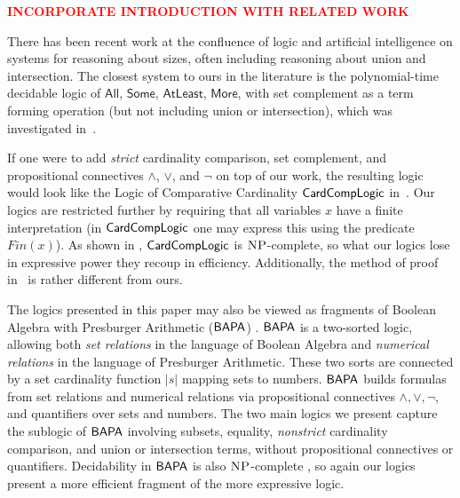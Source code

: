 \documentclass[letterpaper]{article}
\theoremstyle{definition}
\newcommand{\orr}{\vee}
\newcommand{\andd}{\wedge}
\newcommand{\nott}{\neg}
\newcommand{\BAPA}{\sf{BAPA}}
\newcommand{\CardCompLogic}{\sf{CardCompLogic}}
\newcommand{\NP}{\textsc{NP}}
\newcommand{\AllNoArgs}{\mathsf{All}}
\newcommand{\SomeNoArgs}{\mathsf{Some}}
\newcommand{\AtleastNoArgs}{\mathsf{AtLeast}}
\newcommand{\MoreNoArgs}{\mathsf{More}}
\begin{document}
\textbf{\textcolor{red}{INCORPORATE INTRODUCTION WITH RELATED WORK}}

There has been recent work at the confluence of logic and artificial intelligence on systems for reasoning about sizes, often including reasoning about union and intersection.
The closest system to ours in the literature is the polynomial-time decidable logic of $\AllNoArgs$, $\SomeNoArgs$,
$\AtleastNoArgs$, $\MoreNoArgs$, with set complement as a term forming
operation (but not including union or intersection), which was investigated in~\cite{syllogistic_cardinality_comparisons}.

If one were to add \emph{strict} cardinality comparison, set complement, and propositional connectives $\andd$, $\orr$, and $\nott$ on top of our work, the resulting logic would look like the Logic of Comparative Cardinality $\CardCompLogic$ in~\cite{DHH}.  Our logics are restricted further by requiring that all variables $x$ have a finite interpretation (in $\CardCompLogic$ one may express this using the predicate $Fin(x)$).
As shown in \cite{DHH}, $\CardCompLogic$ is $\NP$-complete, so what our logics lose in expressive power they recoup in efficiency.
Additionally, the method of proof in~\cite{DHH} is rather different from ours.

The logics presented in this paper may also be viewed as fragments of Boolean Algebra with Presburger Arithmetic ($\BAPA$) \cite{boolean_algebra_presburger_arithmetic}.
$\BAPA$ is a two-sorted logic, allowing both \emph{set relations} in the language of Boolean Algebra and \emph{numerical relations} in the language of Presburger Arithmetic. These two sorts are connected by a set cardinality function $|s|$ mapping sets to numbers. $\BAPA$ builds formulas from set relations and numerical relations via propositional connectives $\andd, \orr, \neg$, and quantifiers over sets and numbers.
The two main logics we present capture the sublogic of $\BAPA$ involving subsets, equality, \emph{nonstrict} cardinality comparison, and union or intersection terms, without propositional connectives or quantifiers.  Decidability in $\BAPA$ is also $\NP$-complete \cite{towards_efficient_bapa}, so again our logics present a more efficient fragment of the more expressive logic.
\end{document}
